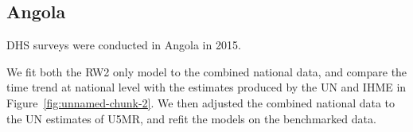 \documentclass[12pt]{article}\usepackage[]{graphicx}\usepackage[]{color}
\begin{document}



\subsection{Angola}





DHS surveys were conducted in Angola in 2015.

We fit both the RW2 only model to the combined national data, and compare the time trend at national level with the estimates produced by the UN and IHME in Figure~\ref{fig:unnamed-chunk-2}. We then adjusted the combined national data to the UN estimates of U5MR, and refit the models on the benchmarked data. 
\end{document}
